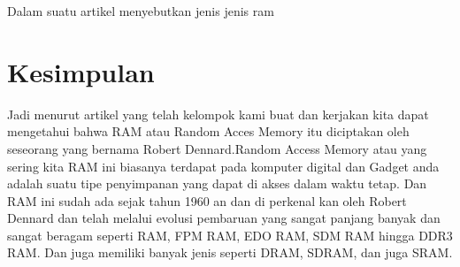 Dalam suatu artikel menyebutkan jenis \- jenis ram \cite{bruce1999unified}

\section{Kesimpulan}
Jadi menurut artikel yang telah kelompok kami buat dan kerjakan kita dapat mengetahui bahwa RAM atau Random Acces Memory itu diciptakan oleh seseorang yang bernama Robert Dennard.Random Access Memory atau yang sering kita RAM ini biasanya terdapat pada komputer digital dan Gadget anda adalah suatu tipe penyimpanan yang dapat di akses dalam waktu tetap. Dan RAM ini sudah ada sejak tahun 1960 an dan di perkenal kan oleh Robert Dennard dan telah melalui evolusi pembaruan yang sangat panjang banyak dan sangat beragam seperti RAM, FPM RAM, EDO RAM, SDM RAM hingga DDR3 RAM. Dan juga memiliki banyak jenis seperti DRAM, SDRAM, dan juga SRAM.